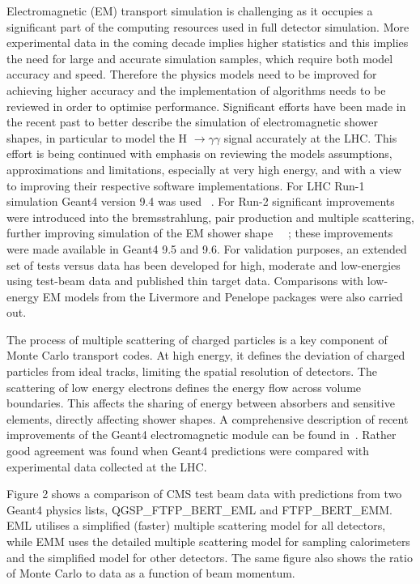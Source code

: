 \documentclass[12pt,a4paper]{article}
\begin{document}
Electromagnetic (EM) transport simulation is challenging as it occupies
a significant part of the computing resources used in full detector
simulation. More experimental data in the coming decade implies higher
statistics and this implies the need for large and accurate simulation
samples, which require both model accuracy and speed. Therefore the
physics models need to be improved for achieving higher accuracy and the
implementation of algorithms needs to be reviewed in order to optimise
performance. Significant efforts have been made in the recent past to
better describe the simulation of electromagnetic shower shapes, in
particular to model the H $\rightarrow \gamma \gamma $ 
signal accurately at the LHC. This effort is being continued with 
emphasis on reviewing the
models assumptions, approximations and limitations, especially at very
high energy, and with a view to improving their respective software
implementations. For LHC Run-1 simulation Geant4 version 9.4 was used
~\cite{1742-6596-331-3-032029}. For Run-2 significant improvements were introduced into the
bremsstrahlung, pair production and multiple scattering,
further improving simulation of the EM shower shape 
~\cite{1742-6596-396-2-022013}~\cite{1742-6596-513-2-022015}; these improvements
were made available in Geant4 9.5 and 9.6. For validation purposes, an
extended set of tests versus data has been developed for high, moderate
and low-energies using test-beam data and published thin target data.
Comparisons with low-energy EM models from the Livermore and Penelope
packages were also carried out.

The process of multiple scattering of charged particles is a key
component of Monte Carlo transport codes. At high energy, it defines the
deviation of charged particles from ideal tracks, limiting the spatial
resolution of detectors. The scattering of low energy electrons defines
the energy flow across volume boundaries. This affects the sharing of
energy between absorbers and sensitive elements, directly affecting
shower shapes. A comprehensive description of recent improvements of the
Geant4 electromagnetic module can be found in~\cite{1742-6596-513-2-022015}. Rather good
agreement was found when Geant4 predictions were compared with
experimental data collected at the LHC.

Figure 2 shows a comparison of CMS test beam data with predictions from
two Geant4 physics lists, QGSP\_FTFP\_BERT\_EML and FTFP\_BERT\_EMM. EML
utilises a simplified (faster) multiple scattering model for all
detectors, while EMM uses the detailed multiple scattering model for
sampling calorimeters and the simplified model for other detectors. The
same figure also shows the ratio of Monte Carlo to data as a function of
beam momentum. 
\end{document}
